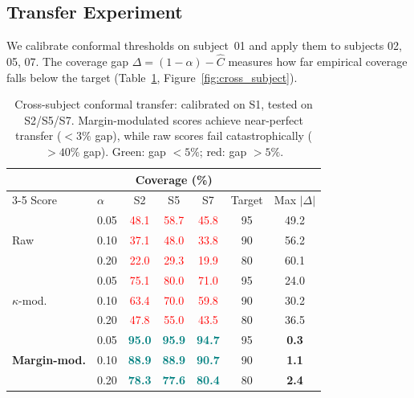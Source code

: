 \documentclass{article}
\begin{document}
\subsection{Transfer Experiment}

We calibrate conformal thresholds on subject~01 and apply them to subjects 02, 05, 07. The coverage gap $\Delta = (1-\alpha) - \hat{C}$ measures how far empirical coverage falls below the target (Table~\ref{tab:cross_subject}, Figure~\ref{fig:cross_subject}).

\begin{table}[t]
\centering
\caption{Cross-subject conformal transfer: calibrated on S1, tested on S2/S5/S7. Margin-modulated scores achieve near-perfect transfer ($<3\%$ gap), while raw scores fail catastrophically ($>40\%$ gap). Green: gap $<5\%$; red: gap $>5\%$.}
\label{tab:cross_subject}
\begin{tabular}{llccccc}
\toprule
 & & \multicolumn{3}{c}{Coverage (\%)} & & \\
\cmidrule(lr){3-5}
Score & $\alpha$ & S2 & S5 & S7 & Target & Max $|\Delta|$ \\
\midrule
\multirow{3}{*}{Raw} 
  & 0.05 & \textcolor{red}{48.1} & \textcolor{red}{58.7} & \textcolor{red}{45.8} & 95 & 49.2 \\
  & 0.10 & \textcolor{red}{37.1} & \textcolor{red}{48.0} & \textcolor{red}{33.8} & 90 & 56.2 \\
  & 0.20 & \textcolor{red}{22.0} & \textcolor{red}{29.3} & \textcolor{red}{19.9} & 80 & 60.1 \\
\midrule
\multirow{3}{*}{$\kappa$-mod.} 
  & 0.05 & \textcolor{red}{75.1} & \textcolor{red}{80.0} & \textcolor{red}{71.0} & 95 & 24.0 \\
  & 0.10 & \textcolor{red}{63.4} & \textcolor{red}{70.0} & \textcolor{red}{59.8} & 90 & 30.2 \\
  & 0.20 & \textcolor{red}{47.8} & \textcolor{red}{55.0} & \textcolor{red}{43.5} & 80 & 36.5 \\
\midrule
\multirow{3}{*}{\textbf{Margin-mod.}} 
  & 0.05 & \textcolor{teal}{\textbf{95.0}} & \textcolor{teal}{\textbf{95.9}} & \textcolor{teal}{\textbf{94.7}} & 95 & \textbf{0.3} \\
  & 0.10 & \textcolor{teal}{\textbf{88.9}} & \textcolor{teal}{\textbf{88.9}} & \textcolor{teal}{\textbf{90.7}} & 90 & \textbf{1.1} \\
  & 0.20 & \textcolor{teal}{\textbf{78.3}} & \textcolor{teal}{\textbf{77.6}} & \textcolor{teal}{\textbf{80.4}} & 80 & \textbf{2.4} \\
\bottomrule
\end{tabular}
\end{table}
\end{document}
